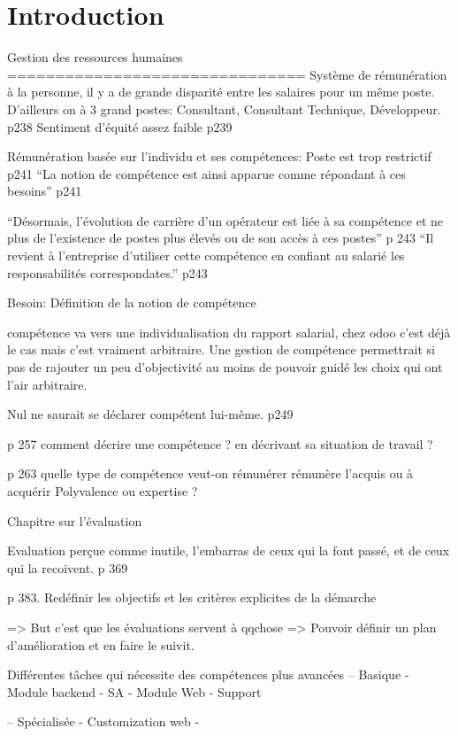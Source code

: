 \chapter*{Introduction}


Gestion des ressources humaines
===============================
Système de rémunération à la personne, il y a de grande disparité entre les salaires pour un même poste. D'ailleurs on à 3 grand postes: Consultant, Consultant Technique, Développeur. p238
Sentiment d'équité assez faible p239

Rémunération basée sur l'individu et ses compétences: Poste est trop restrictif p241
``La notion de compétence est ainsi apparue comme répondant à ces besoins'' p241

``Désormais, l'évolution de carrière d'un opérateur est liée à sa compétence et ne plus de l'existence de postes plus élevés ou de son accès à ces postes'' p 243
``Il revient à l'entreprise d'utiliser cette compétence en confiant au salarié les responsabilités correspondates.'' p243



Besoin: Définition de la notion de compétence


compétence va vers une individualisation du rapport salarial, chez odoo c'est déjà le cas mais c'est vraiment arbitraire. Une gestion de compétence permettrait si pas de rajouter un peu d'objectivité au moins de pouvoir guidé les choix qui ont l'air arbitraire. 


Nul ne saurait se déclarer compétent lui-même. p249

p 257 comment décrire une compétence ? en décrivant sa situation de travail ? 

p 263 quelle type de compétence veut-on rémunérer
rémunère l'acquis ou à acquérir
Polyvalence ou expertise ? 

Chapitre sur l'évaluation

Evaluation perçue comme inutile, l'embarras de ceux qui la font passé, et de ceux qui la recoivent. p 369

p 383. Redéfinir les objectifs et les critères explicites de la démarche

=> But c'est que les évaluations servent à qqchose
=> Pouvoir définir un plan d'amélioration et en faire le suivit.


Différentes tâches qui nécessite des compétences plus avancées
-- Basique
- Module backend
- SA
- Module Web
- Support

-- Spécialisée
- Customization web 
- 



